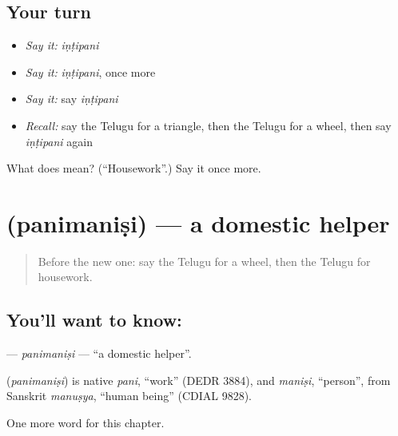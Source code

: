 \subsection*{Your turn}
\begin{itemize}
\raggedright
  \item \emph{Say it:} \emph{iṇṭipani}
  \item \emph{Say it:} \emph{iṇṭipani}, once more
  \item \emph{Say it:} say \emph{iṇṭipani}
  \item \emph{Recall:} say the Telugu for a triangle, then the Telugu for a wheel, then say \emph{iṇṭipani} again
\end{itemize}

\begin{tcolorbox}[breakable,colback=teal!4,colframe=teal!35!black,title={Before you move on}]
What does  mean? (\textquotedblleft{}Housework\textquotedblright{}.) Say it once more.
\end{tcolorbox}
\section[\texorpdfstring{\te{పనిమనిషి} (panimaniṣi)}{పనిమనిషి (panimaniṣi)}]{ (panimaniṣi) — a domestic helper}

\label{lesson:TE-C194-panimanisi}



\begin{quote}
Before the new one: say the Telugu for a wheel, then the Telugu for housework.
\end{quote}

\subsection*{You'll want to know: }
\textbf{} — \emph{panimaniṣi} — \textquotedblleft{}a domestic helper\textquotedblright{}.

\begin{cousinweb}
\textbf{} (\emph{panimaniṣi}) is native \emph{pani}, \textquotedblleft{}work\textquotedblright{} (DEDR 3884), and \emph{maniṣi}, \textquotedblleft{}person\textquotedblright{}, from Sanskrit \emph{manuṣya}, \textquotedblleft{}human being\textquotedblright{} (CDIAL 9828).
\end{cousinweb}

\begin{grammarlens}[title={What you've built}]
One more word for this chapter.
\end{grammarlens}

